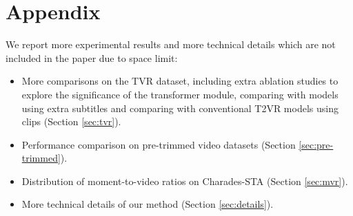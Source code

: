 \documentclass[sigconf]{acmart}
\begin{document}

\balance





















\clearpage

\appendix
\section{Appendix}

We report more experimental results and more technical details which are not included in the paper due to space limit:
\begin{itemize}
    \item More comparisons on the TVR dataset, including extra ablation studies to explore the significance of the transformer module, comparing with models using extra subtitles  and comparing with conventional T2VR models using clips (Section \ref{sec:tvr}).
    \item Performance comparison on pre-trimmed video datasets (Section \ref{sec:pre-trimmed}).
    \item Distribution of moment-to-video ratios on Charades-STA (Section \ref{sec:mvr}).
    \item More technical details of our method (Section \ref{sec:details}).
\end{itemize}
\end{document}
